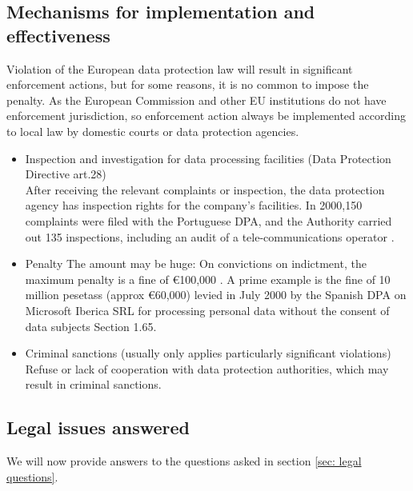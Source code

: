 \documentclass[11pt]{article}
\newcommand{\DPD}{Data Protection Directive }
\begin{document}
\subsection{Mechanisms for implementation and effectiveness}

Violation of the European data protection law will result in significant enforcement actions, but for some reasons, it is no common to impose the penalty. As the European Commission and other EU institutions do not have enforcement jurisdiction, so enforcement action always be implemented according to local law by domestic courts or data protection agencies.

\begin{itemize}
	
\item Inspection and investigation for data processing facilities (\DPD art.28)\\
After receiving the relevant complaints or inspection, the data protection agency has inspection rights for the company's facilities. In 2000,150 complaints were filed with the Portuguese DPA, and the Authority carried out 135 inspections, including an audit of a tele-communications operator \cite{MSIberica}.

\item Penalty
The amount may be huge: On convictions on indictment, the maximum penalty is a fine of €100,000 \cite{offenceDPact}.
A prime example is the fine of 10 million pesetass (approx €60,000) levied in July 2000 by the Spanish DPA on Microsoft Iberica SRL for processing personal data without the consent of data subjects \cite{MSIberica} Section 1.65.

\item Criminal sanctions (usually only applies particularly significant violations)
Refuse or lack of cooperation with data protection authorities, which may result in criminal sanctions.

\end{itemize}




\subsection{Legal issues answered}
We will now provide answers to the questions asked in section \ref{sec: legal questions}.
\end{document}
